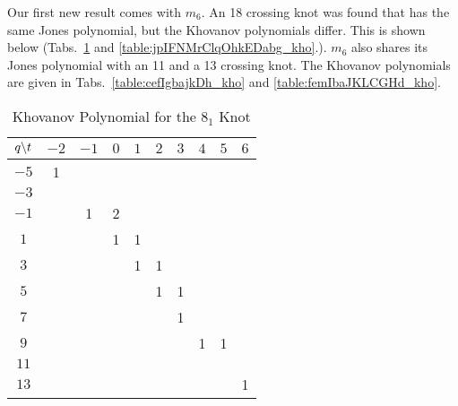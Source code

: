 \documentclass{article}
\theoremstyle{plain}
\begin{document}
        Our first new result comes with $m_{6}$. An 18 crossing knot was found
        that has the same Jones polynomial, but the Khovanov polynomials
        differ. This is shown below
        (Tabs.~\ref{table:m_6_kho} and \ref{table:jpIFNMrClqOhkEDabg_kho}.).
        $m_{6}$ also shares its Jones polynomial with an 11 and a 13 crossing
        knot. The Khovanov polynomials are given in
        Tabs.~\ref{table:cefIgbajkDh_kho} and
        \ref{table:femIbaJKLCGHd_kho}.
        \begin{table}[H]
            \centering
            \begin{tabular}{| c | c | c | c | c | c | c | c | c | c |}
                \hline
                $q\symbol{92}t$&$-2$&$-1$&$0$&$1$&$2$&$3$&$4$&$5$&$6$\\
                \hline
                $-5$&1&&&&&&&&\\
                \hline
                $-3$&&&&&&&&&\\
                \hline
                $-1$&&1&2&&&&&&\\
                \hline
                $1$&&&1&1&&&&&\\
                \hline
                $3$&&&&1&1&&&&\\
                \hline
                $5$&&&&&1&1&&&\\
                \hline
                $7$&&&&&&1&&&\\
                \hline
                $9$&&&&&&&1&1&\\
                \hline
                $11$&&&&&&&&&\\
                \hline
                $13$&&&&&&&&&1\\
                \hline
            \end{tabular}
            \caption{Khovanov Polynomial for the $8_{1}$ Knot}
            \label{table:m_6_kho}
        \end{table}
\end{document}
